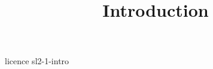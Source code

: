 \documentclass [xcolor=table] {beamer}
\title {Introduction}
\begin{document}
 {licence}
 {sl2-1-intro}
\end{document}
